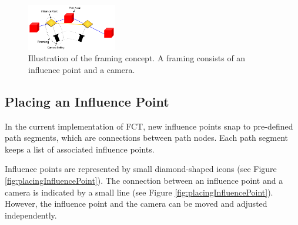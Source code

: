 \begin{figure}[htbp]
\centering
\includegraphics[width=0.35\textwidth]{Pics/Instructions}
\caption{Illustration of the framing concept. A framing consists of an influence point and a camera.}
\label{fig:framingConceptNew}
\end{figure}



\subsection{Placing an Influence Point}
In the current implementation of FCT, new influence points snap to pre-defined path segments, which are connections between path nodes. Each path segment keeps a list of associated influence points.

Influence points are represented by small diamond-shaped icons (see Figure \ref{fig:placingInfluencePoint}). The connection between an influence point and a camera is indicated by a small line (see Figure \ref{fig:placingInfluencePoint}). However, the influence point and the camera can be moved and adjusted independently.


